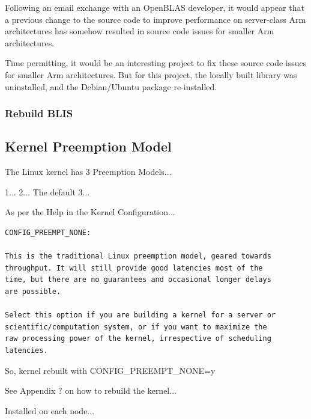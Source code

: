 \documentclass{report}
\begin{document}
Following an email exchange with an OpenBLAS developer, it would appear that a previous change to the source code to improve performance on server-class Arm architectures has somehow resulted in source code issues for smaller Arm architectures.

Time permitting, it would be an interesting project to fix these source code issues for smaller Arm architectures. But for this project, the locally built library was uninstalled, and the Debian/Ubuntu package re-installed.


%
%
\subsubsection{Rebuild BLIS}


%
%
\subsection{Kernel Preemption Model}

The Linux kernel has 3 Preemption Models...

1...
2... The default
3...


As per the Help in the Kernel Configuration...

\lstset{style=listing}
\begin{lstlisting}[numbers=none, caption=Kernel Configuration Preemption Model Help]
CONFIG_PREEMPT_NONE:                                                                                                                                                                                                                                                 

This is the traditional Linux preemption model, geared towards
throughput. It will still provide good latencies most of the
time, but there are no guarantees and occasional longer delays
are possible.                                                                                                                       

Select this option if you are building a kernel for a server or
scientific/computation system, or if you want to maximize the
raw processing power of the kernel, irrespective of scheduling
latencies.
\end{lstlisting}

So, kernel rebuilt with CONFIG\_PREEMPT\_NONE=y

See Appendix ? on how to rebuild the kernel...

Installed on each node...
\end{document}
